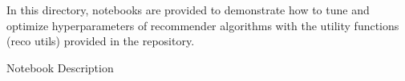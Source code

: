 In this directory, notebooks are provided to demonstrate how to tune and optimize hyperparameters of recommender algorithms with the utility functions (reco utils) provided in the repository.

Notebook	Description

